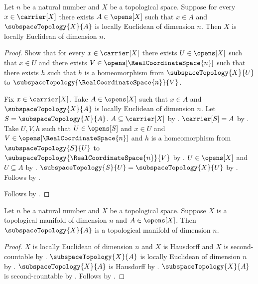 \begin{theorem}\label{locally_euclidean_from_open_neighbourhoods}
    Let $n$ be a natural number and $X$ be a topological space.
    Suppose for every $x\in\carrier[X]$ there exists $A\in\opens[X]$ such that
        $x\in A$ and $\subspaceTopology{X}{A}$ is locally Euclidean of dimension $n$.
    Then $X$ is locally Euclidean of dimension $n$.
\end{theorem}
\begin{proof}
    Show that for every $x\in\carrier[X]$ there exists $U\in\opens[X]$ such that
        $x\in U$ and there exists $V\in\opens[\RealCoordinateSpace{n}]$ such that
        there exists $h$ such that $h$ is a homeomorphism from $\subspaceTopology{X}{U}$ to
            $\subspaceTopology{\RealCoordinateSpace{n}}{V}$.
    \begin{subproof}
        Fix $x\in\carrier[X]$.
        Take $A\in\opens[X]$ such that $x\in A$ and
            $\subspaceTopology{X}{A}$ is locally Euclidean of dimension $n$.
        Let $S=\subspaceTopology{X}{A}$.
        $A\subseteq\carrier[X]$ by .
        $\carrier[S]=A$ by .
        Take $U,V,h$ such that $U\in\opens[S]$ and $x\in U$ and
            $V\in\opens[\RealCoordinateSpace{n}]$ and $h$ is a homeomorphism from
            $\subspaceTopology{S}{U}$ to $\subspaceTopology{\RealCoordinateSpace{n}}{V}$ by
            .
        $U\in\opens[X]$ and $U\subseteq A$ by .
        $\subspaceTopology{S}{U}=\subspaceTopology{X}{U}$ by .
        Follows by \auto.
    \end{subproof}
    Follows by .
\end{proof}

\begin{theorem}\label{open_subspace_is_topological_manifold}
    Let $n$ be a natural number and $X$ be a topological space.
    Suppose $X$ is a topological manifold of dimension $n$ and $A\in\opens[X]$.
    Then $\subspaceTopology{X}{A}$ is a topological manifold of dimension $n$.
\end{theorem}
\begin{proof}
    $X$ is locally Euclidean of dimension $n$ and $X$ is Hausdorff and $X$ is second-countable by
        .
    $\subspaceTopology{X}{A}$ is locally Euclidean of dimension $n$ by
        .
    $\subspaceTopology{X}{A}$ is Hausdorff by .
    $\subspaceTopology{X}{A}$ is second-countable by .
    Follows by .
\end{proof}
